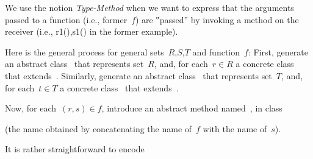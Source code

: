 We use the notion \emph{Type-Method} when we want to express that the arguments passed to a function
  (i.e., former~$f$) are ‟passed” by invoking a method on the receiver (i.e., r1(),s1() in the former example).

Here is the general process for general sets~$R$,$S$,$T$ and function~$f$:
First, generate an abstract class~ that represents set~$R$, and,
  for each~$r∈R$ a concrete class~ that extends~.
Similarly, generate an abstract class~ that represents set~$T$, and,
  for each~$t∈T$ a concrete class~ that extends~.

Now, for each~$(r,s)∈f$, introduce an abstract method named~,
  in class~

(the name obtained by
  concatenating the name of~$f$ with the name of~$s$).

It is rather straightforward to encode
